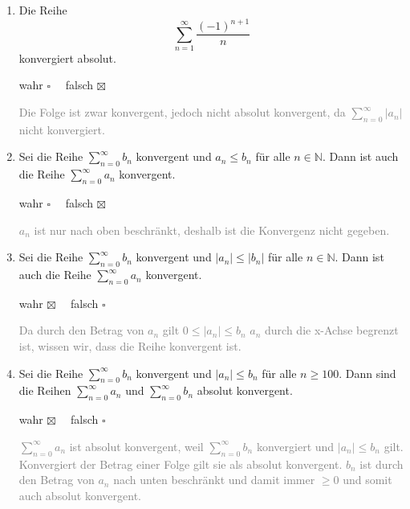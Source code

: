 \documentclass[a4paper]{article}
\begin{document}
\begin{enumerate}[label=({\alph*})]
    \item Die Reihe
    \[\sum\limits^\infty_{n=1}\frac{(-1)^{n+1}}{n}\]
    konvergiert absolut.
    \begin{flushright}
        wahr $\square\quad$ falsch $\boxtimes$
    \end{flushright}
    \textcolor{gray}{Die Folge ist zwar konvergent, jedoch nicht absolut konvergent, da $\sum\limits^\infty_{n=0}|a_n|$ nicht konvergiert.}
    \item Sei die Reihe $\sum\limits^\infty_{n=0}b_n$ konvergent und $a_n\leq b_n$ für alle $n\in\mathbb{N}$. Dann ist auch die Reihe $\sum\limits^\infty_{n=0}a_n$ konvergent.
    \begin{flushright}
        wahr $\square\quad$ falsch $\boxtimes$
    \end{flushright}
    \textcolor{gray}{$a_n$ ist nur nach oben beschränkt, deshalb ist die Konvergenz nicht gegeben.}
    \item Sei die Reihe $\sum\limits^\infty_{n=0}b_n$ konvergent und $|a_n|\leq |b_n|$ für alle $n\in\mathbb{N}$. Dann ist auch die Reihe $\sum\limits^\infty_{n=0}a_n$ konvergent.
    \begin{flushright}
        wahr $\boxtimes\quad$ falsch $\square$
    \end{flushright}
    \textcolor{gray}{Da durch den Betrag von $a_n$ gilt $0\leq |a_n|\leq b_n$ $a_n$ durch die x-Achse begrenzt ist, wissen wir, dass die Reihe konvergent ist.}
    \item Sei die Reihe $\sum\limits^\infty_{n=0}b_n$ konvergent und $|a_n|\leq b_n$ für alle $n\geq 100$. Dann sind die Reihen $\sum\limits^\infty_{n=0}a_n$ und $\sum\limits^\infty_{n=0}b_n$ absolut konvergent.
    \begin{flushright}
        wahr $\boxtimes\quad$ falsch $\square$
    \end{flushright}
    \textcolor{gray}{$\sum\limits^\infty_{n=0}a_n$ ist absolut konvergent, weil $\sum\limits^\infty_{n=0}b_n$ konvergiert und $|a_n|\leq b_n$ gilt. Konvergiert der Betrag einer Folge gilt sie als absolut konvergent. $b_n$ ist durch den Betrag von $a_n$ nach unten beschränkt und damit immer $\geq 0$ und somit auch absolut konvergent.}
\end{enumerate}
\end{document}
